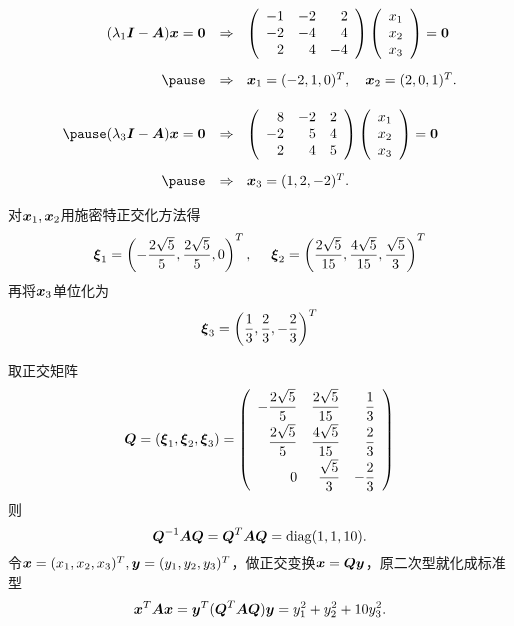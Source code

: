 \begin{frame}
  
    $$
    \begin{array}{rl}
      (\lambda_1\MI-\MA)\vx=\M0 & \Rightarrow~~
      \left(
      \begin{array}{rrr}
        -1&-2&2\\
        -2&-4&4\\
        2&4&-4
      \end{array}
      \right)\left(
      \begin{array}{c}
        x_1\\
        x_2\\
        x_3
      \end{array}
      \right)=\M0\\[0.3in] \pause
      & \Rightarrow~~
      \vx_1=(-2,1,0)^T, \quad
      \vx_2=(2,0,1)^T. \\[0.2in]\pause
      (\lambda_3\MI-\MA)\vx=\M0 & \Rightarrow~~
      \left(
      \begin{array}{rrr}
        8&-2&2\\
        -2&5&4\\
        2&4&5
      \end{array}
      \right)\left(
      \begin{array}{c}
        x_1\\
        x_2\\
        x_3
      \end{array}
      \right)=\M0\\[0.3in] \pause
      & \Rightarrow~~
      \vx_3=(1,2,-2)^T.
    \end{array}
    $$

    对${\boldsymbol{x}}_1,{\boldsymbol{x}}_2$用施密特正交化方法得
    $$
    \boldsymbol{\xi}_1=\left(-\frac{2\sqrt{5}}5,\frac{2\sqrt{5}}5,0\right)^T,~~~~
    \boldsymbol{\xi}_2=\left(\frac{2\sqrt{5}}{15},\frac{4\sqrt{5}}{15},\frac{\sqrt{5}}3\right)^T
    $$
    再将${\boldsymbol{x}}_3$单位化为
    $$
    \boldsymbol{\xi}_3=\left(\frac13,\frac23,-\frac23\right)^T
    $$
  
\end{frame}


\begin{frame}
  
    取正交矩阵
    $$
    \boldsymbol{Q}=(\boldsymbol{\xi}_1,\boldsymbol{\xi}_2,\boldsymbol{\xi}_3)=\left(
    \begin{array}{rrr}
      \displaystyle-\frac{2\sqrt{5}}5&\displaystyle\frac{2\sqrt{5}}{15}&\displaystyle\frac13\\[0.2cm]
      \displaystyle \frac{2\sqrt{5}}5&\displaystyle\frac{4\sqrt{5}}{15}&\displaystyle\frac23\\[0.2cm]
      \displaystyle 0&\displaystyle\frac{\sqrt{5}}3&\displaystyle-\frac23
    \end{array}
    \right)
    $$
    则
    $$
    \boldsymbol{Q}^{-1}\boldsymbol{A}\boldsymbol{Q}=\boldsymbol{Q}^{T}\boldsymbol{A}\boldsymbol{Q}=\mathrm{diag}(1,1,10).
    $$ \pause 
    令${\boldsymbol{x}}=(x_1,x_2,x_3)^T,{\boldsymbol{y}}=(y_1,y_2,y_3)^T$，做正交变换${\boldsymbol{x}}=\boldsymbol{Q}{\boldsymbol{y}}$，原二次型就化成标准型
    $$
    {\boldsymbol{x}}^T\boldsymbol{A}{\boldsymbol{x}}={\boldsymbol{y}}^T(\boldsymbol{Q}^T\boldsymbol{A}\boldsymbol{Q}){\boldsymbol{y}}=y_1^2+y_2^2+10y_3^2.
    $$
  
\end{frame}


